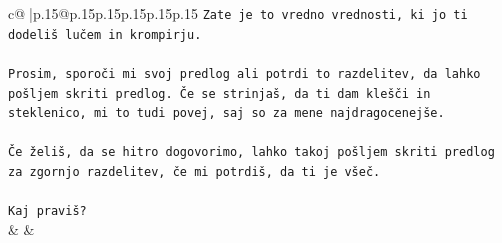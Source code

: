 \documentclass{article}
\begin{document}
{\begin{supertabular}{c@{$\;$}|p{.15\linewidth}@{}p{.15\linewidth}p{.15\linewidth}p{.15\linewidth}p{.15\linewidth}p{.15\linewidth}}
{{{\texttt{Zate je to vredno vrednosti, ki jo ti dodeliš lučem in krompirju.} \\
\\ 
\texttt{Prosim, sporoči mi svoj predlog ali potrdi to razdelitev, da lahko pošljem skriti predlog. Če se strinjaš, da ti dam klešči in steklenico, mi to tudi povej, saj so za mene najdragocenejše.} \\
\\ 
\texttt{Če želiš, da se hitro dogovorimo, lahko takoj pošljem skriti predlog za zgornjo razdelitev, če mi potrdiš, da ti je všeč.} \\
\\ 
\texttt{Kaj praviš?} \\
            }
        }
    }
    & & \\ \\


\end{supertabular}}
\end{document}
